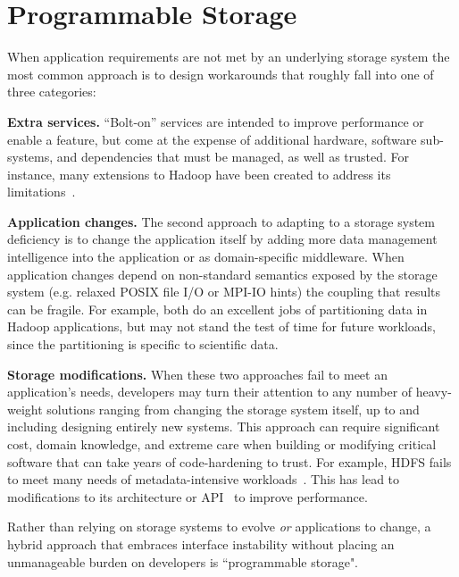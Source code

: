 \section{Programmable Storage}
\label{sec:progly}

When application requirements are not met by an underlying storage system the
most common approach is to design workarounds that roughly fall into one
of three categories:

{\bf Extra services.} ``Bolt-on'' services are intended to improve performance
or enable a feature, but come at the expense of additional hardware, software
sub-systems, and dependencies that must be managed, as well as trusted.
For instance, many extensions to Hadoop have been created to address its
limitations~\cite{bu:vldb2010-haloop, ekanayake:hpdc2010-twister,
ekanayake:escience2008-eglmapreduce, mihailescu:hotstorage2012-mixapart}.

{\bf Application changes.} The second approach to adapting to a storage system
deficiency is to change the application itself by adding more data management
intelligence into the application or as domain-specific middleware. When
application changes depend on non-standard semantics exposed by the storage
system (e.g. relaxed POSIX file I/O or MPI-IO hints) the coupling that results
can be fragile.
For example, \cite{buck:hpc2011-scihadoop, gkantsidis:nsdi2013-rhea} both do
an excellent jobs of partitioning data in Hadoop applications, but may not
stand the test of time for future workloads, since the partitioning is
specific to scientific data.

{\bf Storage modifications.} When these two approaches fail to meet an
application's needs, developers may turn their attention to any number of
heavy-weight solutions ranging from changing the storage system itself, up to
and including designing entirely new systems. This approach can require
significant cost, domain knowledge, and extreme care when building or
modifying critical software that can take years of code-hardening to trust.
For example, HDFS fails to meet many needs 
of metadata-intensive workloads~\cite{shvachko:login2012-hdfs-scalability}.
This has lead to modifications to its architecture or
API~\cite{balmin:sigmod2012-clydesdale} to improve performance.

Rather than relying on storage systems to evolve \emph{or} applications to
change, a hybrid approach that embraces interface instability without placing
an unmanageable burden on developers is ``programmable storage".

